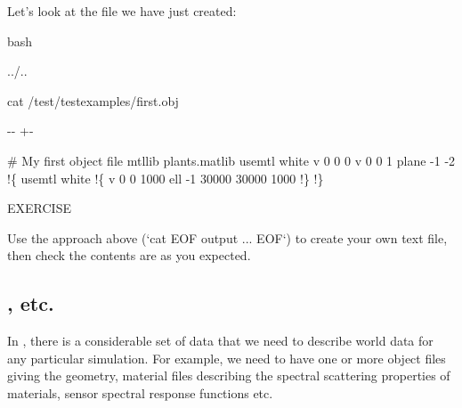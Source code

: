 \documentclass[letterpaper,10pt,english]{sphinxmanual}
\newlength\nbsphinxcodecellspacing
\begin{document}
Let’s look at the file we have just created:

{
\begin{sphinxVerbatim}[commandchars=\\\{\}]
\llap{\color{nbsphinxin}[21]:\,\hspace{\fboxrule}\hspace{\fboxsep}}\PYGZpc{}\PYGZpc{}bash

 ../..

cat /test/test\PYGZus{}examples/first.obj
\end{sphinxVerbatim}
}

{

\kern-\sphinxverbatimsmallskipamount\kern-\baselineskip
\kern+\FrameHeightAdjust\kern-\fboxrule
\vspace{\nbsphinxcodecellspacing}

\begin{sphinxVerbatim}[commandchars=\\\{\}]
\# My first object file
mtllib plants.matlib
usemtl white
v 0 0 0
v 0 0 1
plane -1 -2
!\{
usemtl white
!\{
v 0 0 1000
ell -1 30000 30000 1000
!\}
!\}
\end{sphinxVerbatim}
}

\begin{sphinxVerbatim}[commandchars=\\\{\}]
EXERCISE

Use the approach above (`cat \PYGZlt{}\PYGZlt{}EOF \PYGZgt{} output ... EOF`) to create your own text file, then check the contents are as you expected.
\end{sphinxVerbatim}


\subsection{,  etc.}
\label{\detokenize{Appendix1:MATLIB,-RSRLIB-etc.}}
In , there is a considerable set of data that we need to describe world data for any particular simulation. For example, we need to have one or more object files giving the geometry, material files describing the spectral scattering properties of materials, sensor spectral response functions etc.
\end{document}
